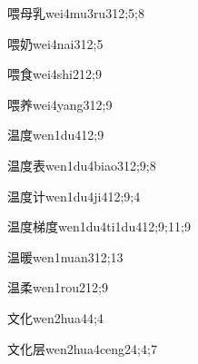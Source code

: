 \begin{verbete}{喂母乳}{wei4mu3ru3}{12;5;8}
\end{verbete}

\begin{verbete}{喂奶}{wei4nai3}{12;5}
\end{verbete}

\begin{verbete}{喂食}{wei4shi2}{12;9}
\end{verbete}

\begin{verbete}{喂养}{wei4yang3}{12;9}
\end{verbete}

\begin{verbete}{温度}{wen1du4}{12;9}
\end{verbete}

\begin{verbete}{温度表}{wen1du4biao3}{12;9;8}
\end{verbete}

\begin{verbete}{温度计}{wen1du4ji4}{12;9;4}
\end{verbete}

\begin{verbete}{温度梯度}{wen1du4ti1du4}{12;9;11;9}
\end{verbete}

\begin{verbete}{温暖}{wen1nuan3}{12;13}
\end{verbete}

\begin{verbete}{温柔}{wen1rou2}{12;9}
\end{verbete}

\begin{verbete}{文化}{wen2hua4}{4;4}
\end{verbete}

\begin{verbete}{文化层}{wen2hua4ceng2}{4;4;7}
\end{verbete}

